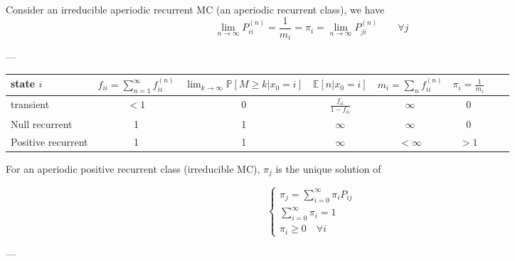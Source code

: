 	\begin{theorem}
		Consider an irreducible aperiodic recurrent MC (an aperiodic recurrent class), we have
		$$ \lim_{n\to \infty} P_{ii}^{(n)} = \frac{1}{m_i} = \pi_i = \lim_{n\to\infty} P_{ji}^{(n)} \qquad \forall j$$
	\end{theorem}
	---

	\begin{center}
		\begin{tabular}{|l*{6}{|c}r}
			\hline
			state $i$ & $f_{ii} = \sum_{n=1}^\infty f_{ii}^{(n)}$  & $\lim_{k \to \infty } \mathbb{P}[M \geq k | x_0=i]$ & $\mathbb{E}[n|x_0=i]$ & $m_i = \sum_n f_{ii}^{(n)}$ & $\pi_i = \frac{1}{m_i}$  \\ \hline

			transient & $<1$ & 0 & $\frac{f_{ii}}{1-f_{ii}}$ & $\infty$ & 0 \\ \hline
			Null recurrent & 1 & 1 & $\infty$ & $\infty$ & 0 \\ \hline
			Positive recurrent & 1 & 1 & $\infty$ & $<\infty$ & $>1$ \\ \hline
		\end{tabular}
	\end{center}

	\begin{theorem}
		For an aperiodic positive recurrent class (irreducible MC), $\pi_j$ is the unique solution of
		
		$$\begin{cases}
			\pi_j = \sum_{i=0}^\infty \pi_i P_{ij} \\
			\sum_{i=0}^\infty \pi_i = 1 \\
			\pi_i \geq 0 \quad \forall i
		\end{cases}$$
	\end{theorem}
	---

